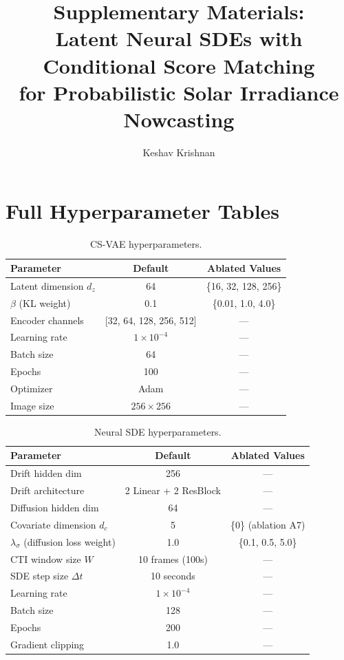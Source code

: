 \documentclass{article}
\title{Supplementary Materials:\\Latent Neural SDEs with Conditional Score Matching\\for Probabilistic Solar Irradiance Nowcasting}
\author{Keshav Krishnan}
\begin{document}
\maketitle

\appendix

\section{Full Hyperparameter Tables}
\label{app:hyperparams}

\begin{table}[h]
\centering
\caption{CS-VAE hyperparameters.}
\begin{tabular}{lcc}
\toprule
Parameter & Default & Ablated Values \\
\midrule
Latent dimension $d_z$ & 64 & \{16, 32, 128, 256\} \\
$\beta$ (KL weight) & 0.1 & \{0.01, 1.0, 4.0\} \\
Encoder channels & [32, 64, 128, 256, 512] & --- \\
Learning rate & $1 \times 10^{-4}$ & --- \\
Batch size & 64 & --- \\
Epochs & 100 & --- \\
Optimizer & Adam & --- \\
Image size & $256 \times 256$ & --- \\
\bottomrule
\end{tabular}
\end{table}

\begin{table}[h]
\centering
\caption{Neural SDE hyperparameters.}
\begin{tabular}{lcc}
\toprule
Parameter & Default & Ablated Values \\
\midrule
Drift hidden dim & 256 & --- \\
Drift architecture & 2 Linear + 2 ResBlock & --- \\
Diffusion hidden dim & 64 & --- \\
Covariate dimension $d_c$ & 5 & \{0\} (ablation A7) \\
$\lambda_\sigma$ (diffusion loss weight) & 1.0 & \{0.1, 0.5, 5.0\} \\
CTI window size $W$ & 10 frames (100s) & --- \\
SDE step size $\Delta t$ & 10 seconds & --- \\
Learning rate & $1 \times 10^{-4}$ & --- \\
Batch size & 128 & --- \\
Epochs & 200 & --- \\
Gradient clipping & 1.0 & --- \\
\bottomrule
\end{tabular}
\end{table}
\end{document}

